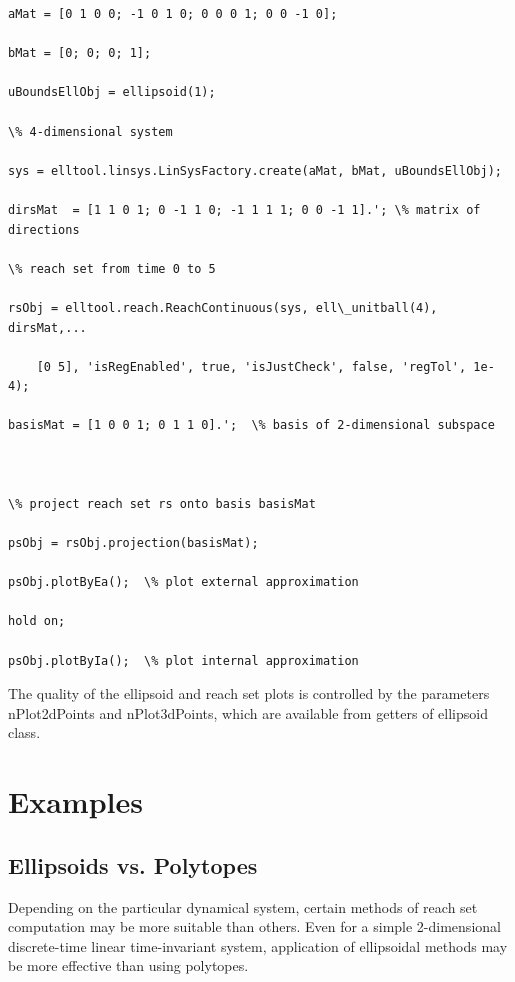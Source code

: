 \documentclass[letterpaper,10pt,english]{sphinxmanual}
\begin{document}
\begin{Verbatim}[commandchars=\\\{\}]
aMat = [0 1 0 0; -1 0 1 0; 0 0 0 1; 0 0 -1 0];

bMat = [0; 0; 0; 1];

uBoundsEllObj = ellipsoid(1);

\% 4-dimensional system

sys = elltool.linsys.LinSysFactory.create(aMat, bMat, uBoundsEllObj);

dirsMat  = [1 1 0 1; 0 -1 1 0; -1 1 1 1; 0 0 -1 1].'; \% matrix of directions

\% reach set from time 0 to 5

rsObj = elltool.reach.ReachContinuous(sys, ell\_unitball(4), dirsMat,...

    [0 5], 'isRegEnabled', true, 'isJustCheck', false, 'regTol', 1e-4);

basisMat = [1 0 0 1; 0 1 1 0].';  \% basis of 2-dimensional subspace



\% project reach set rs onto basis basisMat

psObj = rsObj.projection(basisMat);

psObj.plotByEa();  \% plot external approximation

hold on;

psObj.plotByIa();  \% plot internal approximation
\end{Verbatim}

The quality of the ellipsoid and reach set plots is controlled by the
parameters nPlot2dPoints and nPlot3dPoints, which are available from
getters of ellipsoid class.


\chapter{Examples}
\label{chap_examples::doc}\label{chap_examples:examples}

\section{Ellipsoids vs. Polytopes}
\label{chap_examples:ellipsoids-vs-polytopes}
Depending on the particular dynamical system, certain methods of reach
set computation may be more suitable than others. Even for a simple
2-dimensional discrete-time linear time-invariant system, application of
ellipsoidal methods may be more effective than using polytopes.
\end{document}
